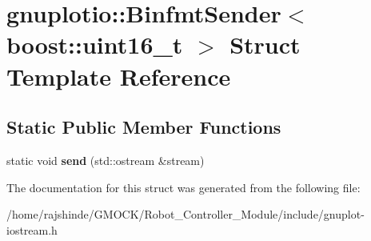 \hypertarget{structgnuplotio_1_1_binfmt_sender_3_01boost_1_1uint16__t_01_4}{}\section{gnuplotio\+:\+:Binfmt\+Sender$<$ boost\+:\+:uint16\+\_\+t $>$ Struct Template Reference}
\label{structgnuplotio_1_1_binfmt_sender_3_01boost_1_1uint16__t_01_4}
\subsection*{Static Public Member Functions}
\begin{DoxyCompactItemize}
\item 
static void {\bfseries send} (std\+::ostream \&stream)\hypertarget{structgnuplotio_1_1_binfmt_sender_3_01boost_1_1uint16__t_01_4_a7bb7f0a62a21496b9e85ce35f0170717}{}\label{structgnuplotio_1_1_binfmt_sender_3_01boost_1_1uint16__t_01_4_a7bb7f0a62a21496b9e85ce35f0170717}

\end{DoxyCompactItemize}


The documentation for this struct was generated from the following file\+:\begin{DoxyCompactItemize}
\item 
/home/rajshinde/\+G\+M\+O\+C\+K/\+Robot\+\_\+\+Controller\+\_\+\+Module/include/gnuplot-\/iostream.\+h\end{DoxyCompactItemize}
